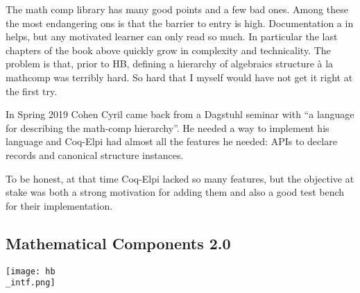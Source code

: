 \documentclass[a4paper, 11pt]{book}
\begin{document}
The math comp library has many good points and a few bad ones. Among these
the most endangering ons is that the barrier to entry is high. Documentation
a in \cite{assia_mahboubi_2022_7118596} helps, but any motivated learner
can only read so much. In particular the last chapters of the book above
quickly grow in complexity and technicality. The problem is that, prior to
HB, defining a hierarchy of algebraics structure à la mathcomp was terribly
hard. So hard that I myself would have not get it right at the first try.

In Spring 2019 Cohen Cyril came back from a Dagstuhl seminar with ``a language for
describing the math-comp hierarchy''. He needed a way to implement his language and
Coq-Elpi had almost all the features he needed: APIs to declare records and
canonical structure instances.

To be honest, at that time Coq-Elpi lacked so many features, but the objective
at stake was both a strong motivation for adding them and also a good test
bench for their implementation.



\cite{cohen_et_al:LIPIcs.FSCD.2020.34}

\subsection{Mathematical Components 2.0}

\cite{affeldt:hal-03463762}

\texttt{[image: hb\\\_intf.png]}


\end{document}
